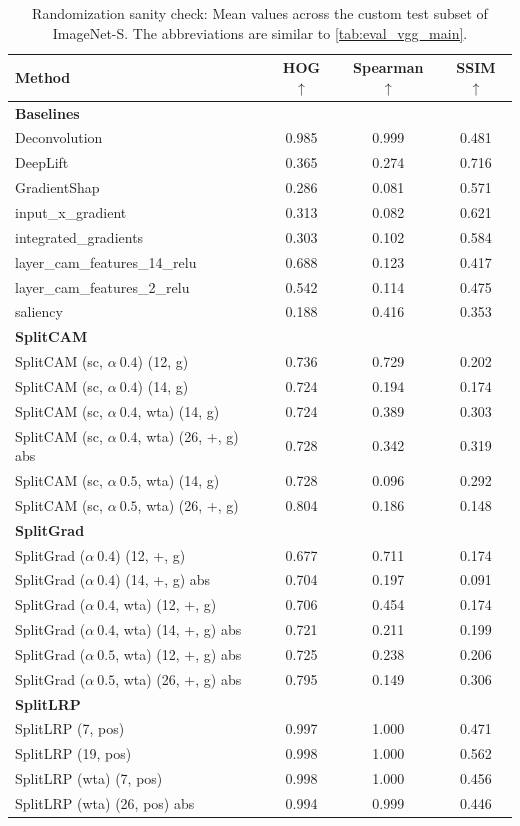 \begin{table}[htbp]
\centering
\caption{Randomization sanity check: Mean values across the custom test subset of ImageNet-S. The abbreviations are similar to \cref{tab:eval_vgg_main}.}
\label{tab:randomization_sanity_check}
\begin{tabular}{l c c c}
\toprule
Method & HOG $\uparrow$ & Spearman $\uparrow$ & SSIM $\uparrow$ \\
\midrule
\multicolumn{4}{l}{\textbf{Baselines}} \\
Deconvolution & 0.985 & 0.999 & 0.481 \\
DeepLift & 0.365 & 0.274 & 0.716 \\
GradientShap & 0.286 & 0.081 & 0.571 \\
input\_x\_gradient & 0.313 & 0.082 & 0.621 \\
integrated\_gradients & 0.303 & 0.102 & 0.584 \\
layer\_cam\_features\_14\_relu & 0.688 & 0.123 & 0.417 \\
layer\_cam\_features\_2\_relu & 0.542 & 0.114 & 0.475 \\
saliency & 0.188 & 0.416 & 0.353 \\

\midrule
\multicolumn{4}{l}{\textbf{SplitCAM}} \\
SplitCAM (sc, $\alpha \ 0.4$) (12, g) & 0.736 & 0.729 & 0.202 \\
SplitCAM (sc, $\alpha \ 0.4$) (14, g) & 0.724 & 0.194 & 0.174 \\
SplitCAM (sc, $\alpha \ 0.4$, wta) (14, g) & 0.724 & 0.389 & 0.303 \\
SplitCAM (sc, $\alpha \ 0.4$, wta) (26, +, g) abs & 0.728 & 0.342 & 0.319 \\
SplitCAM (sc, $\alpha \ 0.5$, wta) (14, g) & 0.728 & 0.096 & 0.292 \\
SplitCAM (sc, $\alpha \ 0.5$, wta) (26, +, g) & 0.804 & 0.186 & 0.148 \\

\midrule
\multicolumn{4}{l}{\textbf{SplitGrad}} \\
SplitGrad ($\alpha \ 0.4$) (12, +, g) & 0.677 & 0.711 & 0.174 \\
SplitGrad ($\alpha \ 0.4$) (14, +, g) abs & 0.704 & 0.197 & 0.091 \\
SplitGrad ($\alpha \ 0.4$, wta) (12, +, g) & 0.706 & 0.454 & 0.174 \\
SplitGrad ($\alpha \ 0.4$, wta) (14, +, g) abs & 0.721 & 0.211 & 0.199 \\
SplitGrad ($\alpha \ 0.5$, wta) (12, +, g) abs & 0.725 & 0.238 & 0.206 \\
SplitGrad ($\alpha \ 0.5$, wta) (26, +, g) abs & 0.795 & 0.149 & 0.306 \\

\midrule
\multicolumn{4}{l}{\textbf{SplitLRP}} \\
SplitLRP (7, pos) & 0.997 & 1.000 & 0.471 \\
SplitLRP (19, pos) & 0.998 & 1.000 & 0.562 \\
SplitLRP (wta) (7, pos) & 0.998 & 1.000 & 0.456 \\
SplitLRP (wta) (26, pos) abs & 0.994 & 0.999 & 0.446 \\
\bottomrule
\end{tabular}
\end{table}
